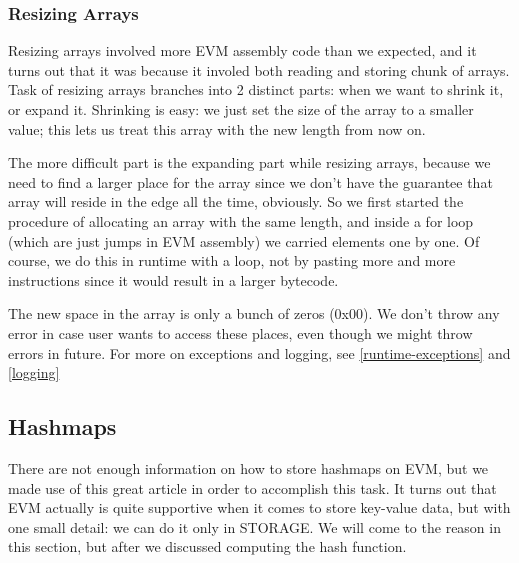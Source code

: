 \documentclass{article}
\begin{document}
\subsubsection{Resizing Arrays}
\label{resizing}
\par Resizing arrays involved more EVM assembly code than we expected, and it turns out that it was because it involed both reading and storing chunk of arrays. \\
Task of resizing arrays branches into 2 distinct parts: when we want to shrink it, or expand it. Shrinking is easy: we just set the size of the array to a smaller value; this lets us treat this array with the new length from now on. \\
\par The more difficult part is the expanding part while resizing arrays, because we need to find a larger place for the array since we don't have the guarantee that array will reside in the edge all the time, obviously. So we first started the procedure of allocating an array with the same length, and inside a for loop (which are just jumps in EVM assembly) we carried elements one by one. Of course, we do this in runtime with a loop, not by pasting more and more instructions since it would result in a larger bytecode.
\par The new space in the array is only a bunch of zeros (0x00). We don't throw any error in case user wants to access these places, even though we might throw errors in future. For more on exceptions and logging, see \ref{runtime-exceptions} and \ref{logging}

\subsection{Hashmaps}
\label{hashmaps}
\par There are not enough information on how to store hashmaps on EVM, but we made use of this great article \cite{hash-table-poisoning} in order to accomplish this task. It turns out that EVM actually is quite supportive when it comes to store key-value data, but with one small detail: we can do it only in STORAGE. We will come to the reason in this section, but after we discussed computing the hash function.
\end{document}
